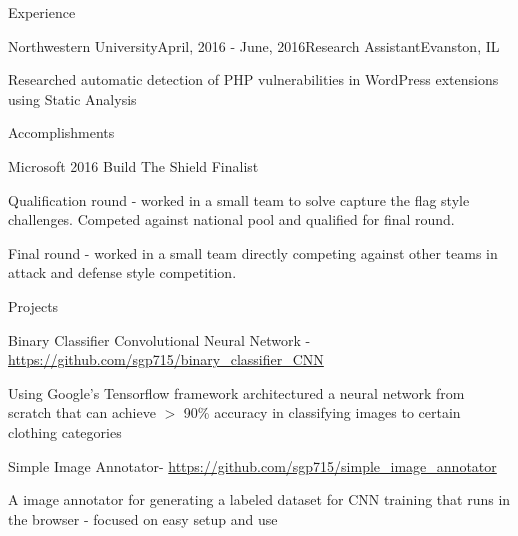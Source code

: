 \documentclass{resume} %
\begin{document}
\begin{rSection}{Experience}

\begin{rSubsection}{Northwestern University}{April, 2016 - June, 2016}{Research Assistant}{Evanston, IL}
\item Researched automatic detection of PHP vulnerabilities in WordPress extensions using Static
Analysis
\end{rSubsection}

\end{rSection}


\begin{rSection}{Accomplishments}

\begin{oSubsection}{Microsoft 2016 Build The Shield Finalist}
	\item Qualification round - worked in a small team to solve capture the flag style challenges. Competed against national pool and qualified for final round.
	\item Final round - worked in a small team directly competing against other teams in attack and defense style competition.
\end{oSubsection}

\end{rSection}


\begin{rSection}{Projects}

\begin{oSubsection}{Binary Classifier Convolutional Neural Network - \url{https://github.com/sgp715/binary_classifier_CNN}}
	\item Using Google's Tensorflow framework architectured a neural network from scratch that can achieve $>$ 90\% accuracy in classifying images to certain clothing categories
\end{oSubsection}
\begin{oSubsection}{Simple Image Annotator- \url{https://github.com/sgp715/simple_image_annotator}}
	\item A image annotator for generating a labeled dataset for CNN training that runs in the browser - focused on easy setup and use
\end{oSubsection}

\end{rSection}
\end{document}
